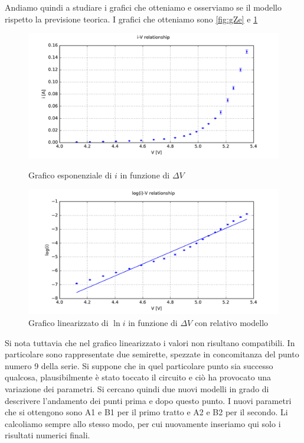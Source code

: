 Andiamo quindi a studiare i grafici che otteniamo e osserviamo se il modello rispetto la previsione teorica. I grafici che otteniamo sono \ref{fig:gZe} e \ref{fig:gZl}

\begin{figure}
    \centering
    \begin{minipage}{0.5\textwidth}
        \centering
        \includegraphics[width=\textwidth]{fig1Z.pdf} 
        \caption{Grafico esponenziale di $i$ in funzione di $\Delta V$}
        \label{fig:gZe}
    \end{minipage}\hfill
    \begin{minipage}{0.5\textwidth}
        \centering
        \includegraphics[width=\textwidth]{fig2Z.pdf} 
        \caption{Grafico linearizzato di $\ln{i}$ in funzione di $\Delta V$ con relativo modello}
        \label{fig:gZl}
    \end{minipage}
\end{figure}

Si nota tuttavia che nel grafico linearizzato i valori non risultano compatibili. In particolare sono rappresentate due semirette, spezzate in concomitanza del punto numero 9 della serie. Si suppone che in quel particolare punto sia successo qualcosa, plausibilmente è stato toccato il circuito e ciò ha provocato una variazione dei parametri. Si cercano quindi due nuovi modelli in grado di descrivere l'andamento dei punti prima e dopo questo punto. I nuovi parametri che si ottengono sono A1 e B1 per il primo tratto e A2 e B2 per il secondo. Li calcoliamo sempre allo stesso modo, per cui nuovamente inseriamo qui solo i risultati numerici finali.

